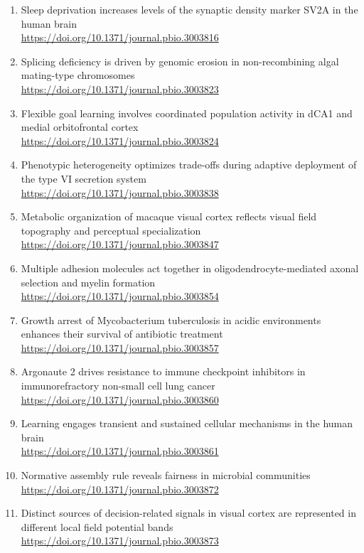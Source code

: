 \begin{enumerate}
        \url{https://doi.org/10.1371/journal.pbio.3003810}
  \item Sleep deprivation increases levels of the synaptic density marker SV2A in the human brain\\
        \url{https://doi.org/10.1371/journal.pbio.3003816}
  \item Splicing deficiency is driven by genomic erosion in non-recombining algal mating-type chromosomes\\
        \url{https://doi.org/10.1371/journal.pbio.3003823}
  \item Flexible goal learning involves coordinated population activity in dCA1 and medial orbitofrontal cortex\\
        \url{https://doi.org/10.1371/journal.pbio.3003824}
  \item Phenotypic heterogeneity optimizes trade-offs during adaptive deployment of the type VI secretion system\\
        \url{https://doi.org/10.1371/journal.pbio.3003838}
  \item Metabolic organization of macaque visual cortex reflects visual field topography and perceptual specialization\\
        \url{https://doi.org/10.1371/journal.pbio.3003847}
  \item Multiple adhesion molecules act together in oligodendrocyte-mediated axonal selection and myelin formation\\
        \url{https://doi.org/10.1371/journal.pbio.3003854}
  \item Growth arrest of Mycobacterium tuberculosis in acidic environments enhances their survival of antibiotic treatment\\
        \url{https://doi.org/10.1371/journal.pbio.3003857}
  \item Argonaute 2 drives resistance to immune checkpoint inhibitors in immunorefractory non-small cell lung cancer\\
        \url{https://doi.org/10.1371/journal.pbio.3003860}
  \item Learning engages transient and sustained cellular mechanisms in the human brain\\
        \url{https://doi.org/10.1371/journal.pbio.3003861}
  \item Normative assembly rule reveals fairness in microbial communities\\
        \url{https://doi.org/10.1371/journal.pbio.3003872}
  \item Distinct sources of decision-related signals in visual cortex are represented in different local field potential bands\\
        \url{https://doi.org/10.1371/journal.pbio.3003873}
\end{enumerate}
